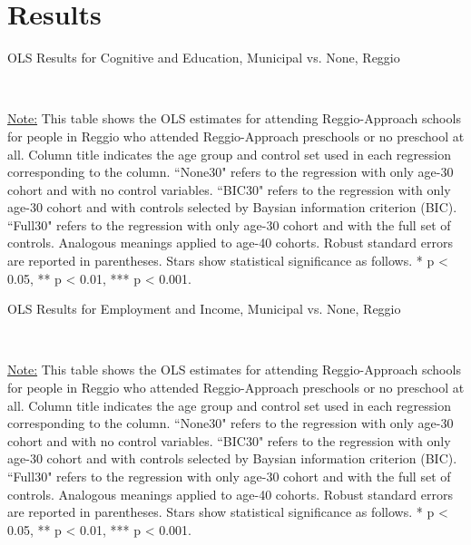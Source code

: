 





\section{Results}
\label{sec:results}

\begin{table}[H] \caption{OLS Results for Cognitive and Education, Municipal vs. None, Reggio} \label{ols-E-reg}
\scalebox{0.93}{
}
\vspace{1ex} \\
\footnotesize\raggedright{\underline{Note:} This table shows the OLS estimates for attending Reggio-Approach schools for people in Reggio who attended Reggio-Approach preschools or no preschool at all. Column title indicates the age group and control set used in each regression corresponding to the column. ``None30" refers to the regression with only age-30 cohort and with no control variables. ``BIC30" refers to the regression with only age-30 cohort and with controls selected by Baysian information criterion (BIC). ``Full30" refers to the regression with only age-30 cohort and with the full set of controls. Analogous meanings applied to age-40 cohorts. Robust standard errors are reported in parentheses. Stars show statistical significance as follows. * p < 0.05, ** p < 0.01, *** p < 0.001.}
\end{table}

\begin{table}[H] \caption{OLS Results for Employment and Income, Municipal vs. None, Reggio} \label{ols-W-reg}
\scalebox{0.9}{
}
\vspace{1ex} \\
\footnotesize\raggedright{\underline{Note:} This table shows the OLS estimates for attending Reggio-Approach schools for people in Reggio who attended Reggio-Approach preschools or no preschool at all. Column title indicates the age group and control set used in each regression corresponding to the column. ``None30" refers to the regression with only age-30 cohort and with no control variables. ``BIC30" refers to the regression with only age-30 cohort and with controls selected by Baysian information criterion (BIC). ``Full30" refers to the regression with only age-30 cohort and with the full set of controls. Analogous meanings applied to age-40 cohorts. Robust standard errors are reported in parentheses. Stars show statistical significance as follows. * p < 0.05, ** p < 0.01, *** p < 0.001.}
\end{table}

